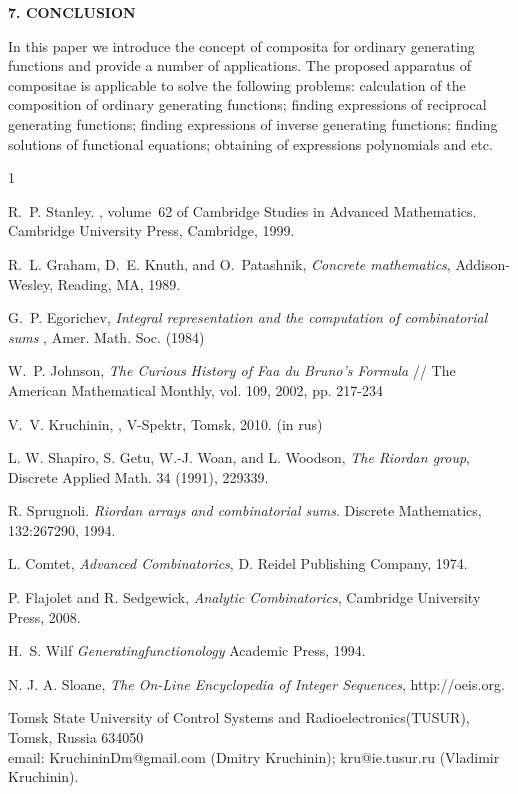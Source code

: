 \documentclass[12pt]{article}
\begin{document}
\vspace{1.5cc}
\begin{center}
{\bf 7. CONCLUSION}
\end{center}
In this paper we introduce the concept of composita for ordinary generating functions and provide a number of applications. The proposed apparatus of compositae is applicable to solve the following problems: calculation of the composition of ordinary generating functions; finding expressions of reciprocal generating functions; finding expressions of inverse generating functions; finding solutions of functional equations; obtaining of expressions polynomials and etc.

\vspace{2cc}


\begin{thebibliography}{1}

 R.~P. Stanley.
, volume~62 of { Cambridge
  Studies in Advanced Mathematics}.
\newblock Cambridge University Press, Cambridge, 1999.

 R.~L. Graham, D.~E. Knuth, and O.~Patashnik, \emph{Concrete mathematics}, \newblock Addison-Wesley, Reading, MA, 1989.

 G.~P. Egorichev, {\em Integral representation and the computation of combinatorial sums} , \newblock Amer. Math. Soc.  (1984)  

W.~P. Johnson, {\em The Curious History of Faa du Bruno's Formula} //
\newblock The American Mathematical Monthly, vol. 109, 2002, pp. 217-234


 V.~V. Kruchinin,
, \newblock V-Spektr, Tomsk, 2010. (in rus)

 L. W. Shapiro, S. Getu, W.-J. Woan, and L. Woodson, {\em The Riordan group}, \newblock Discrete
Applied Math. 34 (1991), 229{339}.

 R. Sprugnoli. {\em Riordan arrays and combinatorial sums}. Discrete Mathematics,
132:267{290, 1994}.

 L. Comtet, 
\newblock \textit{Advanced Combinatorics}, D. Reidel Publishing Company, 1974.

 P. Flajolet and R. Sedgewick, \emph{Analytic Combinatorics}, Cambridge University Press, 2008.


 H.~S. Wilf {\em Generatingfunctionology} \newblock Academic Press, 1994.

N. J. A. Sloane, \emph{The On-Line Encyclopedia of Integer Sequences},
http://oeis.org.
\end{thebibliography}

\vspace{1cc}

Tomsk State University of Control Systems and Radioelectronics(TUSUR),\\
Tomsk, Russia 634050\\
email: KruchininDm@gmail.com (Dmitry Kruchinin);
kru@ie.tusur.ru (Vladimir Kruchinin).

{\small
\noindent











}
\end{document}

